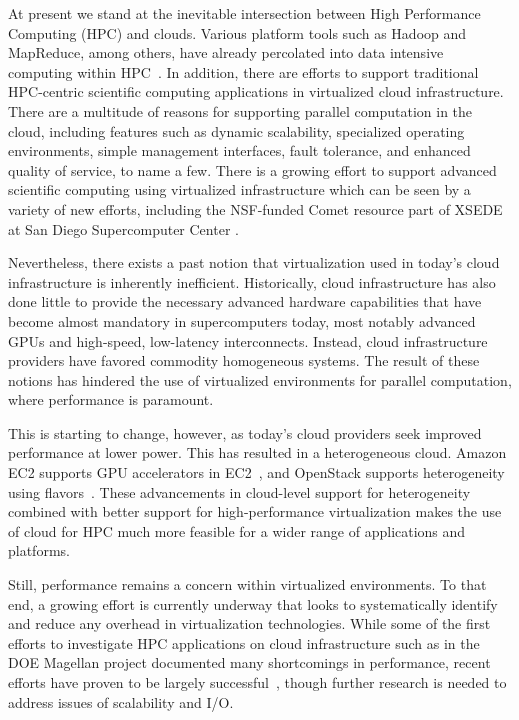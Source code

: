 \documentclass[10pt]{sigplanconf}
\begin{document}
At present we stand at the inevitable intersection between High Performance Computing (HPC) and clouds. Various platform tools such as Hadoop and MapReduce, among others, have already percolated into data intensive computing within HPC~\cite{jha2014apache}.  In addition, there are efforts to support traditional HPC-centric scientific computing applications in virtualized cloud infrastructure.  There are a multitude of reasons for supporting parallel computation in the cloud\cite{Armbrust2010}, including features such as dynamic scalability, specialized operating environments, simple management interfaces, fault tolerance, and enhanced quality of service, to name a few. There is a growing effort to support advanced scientific computing using virtualized infrastructure which can be seen by a variety of new efforts, including the NSF-funded Comet resource part of XSEDE at San Diego Supercomputer Center \cite{moore2014gateways}.  

Nevertheless, there exists a past notion that virtualization used in today's
cloud infrastructure is inherently inefficient.  Historically, cloud
infrastructure has also done little to provide the necessary advanced hardware
capabilities that have become almost mandatory in supercomputers today, most
notably advanced GPUs and high-speed, low-latency interconnects.  Instead, cloud
infrastructure providers have favored commodity homogeneous systems.  The result
of these notions has hindered the use of virtualized environments for parallel
computation, where performance is paramount.

This is starting to change, however, as today's cloud providers seek improved
performance at lower power.  This has resulted in a heterogeneous cloud.
Amazon EC2 supports GPU accelerators in EC2~\cite{www-amazon-gpu}, and
OpenStack supports heterogeneity using flavors~\cite{www-openstack-flavors}.
These advancements in cloud-level support for heterogeneity combined with better
support for high-performance virtualization makes the use of cloud for HPC much
more feasible for a wider range of applications and platforms.

Still, performance remains a concern within virtualized environments.  To that
end, a growing effort is currently underway that looks to systematically identify and
reduce any overhead in virtualization technologies.  While some of the first efforts to investigate HPC applications on cloud infrastructure such as in the DOE Magellan project \cite{yelick2011magellan} documented many shortcomings in performance, recent efforts have proven to be largely successful~\cite{Younge2011cloud, Luszczek:2011:EHC}, though further research is needed to address
issues of scalability and I/O.  
\end{document}
